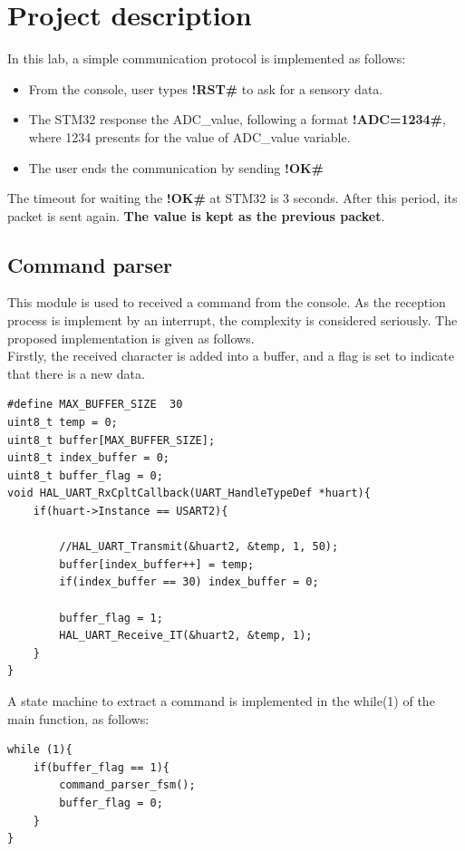 \section{Project description}
In this lab, a simple communication protocol is implemented as follows:
\begin{itemize}
    \item From the console, user types \textbf{!RST\#} to ask for a sensory data.
    \item The STM32 response the ADC\_value, following a format \textbf{!ADC=1234\#}, where 1234 presents for the value of ADC\_value variable.
    \item The user ends the communication by sending \textbf{!OK\#}
\end{itemize}

The timeout for waiting the \textbf{!OK\#} at STM32 is 3 seconds. After this period, its packet is sent again. \textbf{The value is kept as the previous packet}.

\subsection{Command parser}
This module is used to received a command from the console. As the reception process is implement by an interrupt, the complexity is considered seriously. The proposed implementation is given as follows.\\

Firstly, the received character is added into a buffer, and a flag is set to indicate that there is a new data.

\begin{lstlisting}[caption= Add the received character into a buffer]
#define MAX_BUFFER_SIZE  30
uint8_t temp = 0;
uint8_t buffer[MAX_BUFFER_SIZE];
uint8_t index_buffer = 0;
uint8_t buffer_flag = 0;
void HAL_UART_RxCpltCallback(UART_HandleTypeDef *huart){
	if(huart->Instance == USART2){

		//HAL_UART_Transmit(&huart2, &temp, 1, 50);
		buffer[index_buffer++] = temp;
		if(index_buffer == 30) index_buffer = 0;

		buffer_flag = 1;
		HAL_UART_Receive_IT(&huart2, &temp, 1);
	}
}
\end{lstlisting}

A state machine to extract a command is implemented in the while(1) of the main function, as follows:
\begin{lstlisting}[caption= State machine to extract the command]
while (1){
    if(buffer_flag == 1){
        command_parser_fsm();
        buffer_flag = 0;
    }
}
\end{lstlisting}

